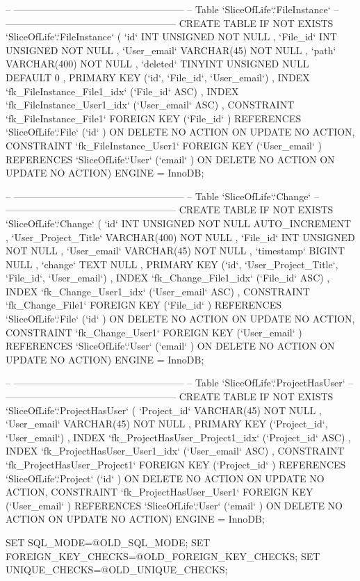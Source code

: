 \begin{spverbatim}
-- -----------------------------------------------------
-- Table `SliceOfLife`.`FileInstance`
-- -----------------------------------------------------
CREATE  TABLE IF NOT EXISTS `SliceOfLife`.`FileInstance` (
  `id` INT UNSIGNED NOT NULL ,
  `File_id` INT UNSIGNED NOT NULL ,
  `User_email` VARCHAR(45) NOT NULL ,
  `path` VARCHAR(400) NOT NULL ,
  `deleted` TINYINT UNSIGNED NULL DEFAULT 0 ,
  PRIMARY KEY (`id`, `File_id`, `User_email`) ,
  INDEX `fk_FileInstance_File1_idx` (`File_id` ASC) ,
  INDEX `fk_FileInstance_User1_idx` (`User_email` ASC) ,
  CONSTRAINT `fk_FileInstance_File1`
    FOREIGN KEY (`File_id` )
    REFERENCES `SliceOfLife`.`File` (`id` )
    ON DELETE NO ACTION
    ON UPDATE NO ACTION,
  CONSTRAINT `fk_FileInstance_User1`
    FOREIGN KEY (`User_email` )
    REFERENCES `SliceOfLife`.`User` (`email` )
    ON DELETE NO ACTION
    ON UPDATE NO ACTION)
ENGINE = InnoDB;


-- -----------------------------------------------------
-- Table `SliceOfLife`.`Change`
-- -----------------------------------------------------
CREATE  TABLE IF NOT EXISTS `SliceOfLife`.`Change` (
  `id` INT UNSIGNED NOT NULL AUTO_INCREMENT ,
  `User_Project_Title` VARCHAR(400) NOT NULL ,
  `File_id` INT UNSIGNED NOT NULL ,
  `User_email` VARCHAR(45) NOT NULL ,
  `timestamp` BIGINT NULL ,
  `change` TEXT NULL ,
  PRIMARY KEY (`id`, `User_Project_Title`, `File_id`, `User_email`) ,
  INDEX `fk_Change_File1_idx` (`File_id` ASC) ,
  INDEX `fk_Change_User1_idx` (`User_email` ASC) ,
  CONSTRAINT `fk_Change_File1`
    FOREIGN KEY (`File_id` )
    REFERENCES `SliceOfLife`.`File` (`id` )
    ON DELETE NO ACTION
    ON UPDATE NO ACTION,
  CONSTRAINT `fk_Change_User1`
    FOREIGN KEY (`User_email` )
    REFERENCES `SliceOfLife`.`User` (`email` )
    ON DELETE NO ACTION
    ON UPDATE NO ACTION)
ENGINE = InnoDB;


-- -----------------------------------------------------
-- Table `SliceOfLife`.`ProjectHasUser`
-- -----------------------------------------------------
CREATE  TABLE IF NOT EXISTS `SliceOfLife`.`ProjectHasUser` (
  `Project_id` VARCHAR(45) NOT NULL ,
  `User_email` VARCHAR(45) NOT NULL ,
  PRIMARY KEY (`Project_id`, `User_email`) ,
  INDEX `fk_ProjectHasUser_Project1_idx` (`Project_id` ASC) ,
  INDEX `fk_ProjectHasUser_User1_idx` (`User_email` ASC) ,
  CONSTRAINT `fk_ProjectHasUser_Project1`
    FOREIGN KEY (`Project_id` )
    REFERENCES `SliceOfLife`.`Project` (`id` )
    ON DELETE NO ACTION
    ON UPDATE NO ACTION,
  CONSTRAINT `fk_ProjectHasUser_User1`
    FOREIGN KEY (`User_email` )
    REFERENCES `SliceOfLife`.`User` (`email` )
    ON DELETE NO ACTION
    ON UPDATE NO ACTION)
ENGINE = InnoDB;



SET SQL_MODE=@OLD_SQL_MODE;
SET FOREIGN_KEY_CHECKS=@OLD_FOREIGN_KEY_CHECKS;
SET UNIQUE_CHECKS=@OLD_UNIQUE_CHECKS;
\end{spverbatim}
\newpage
